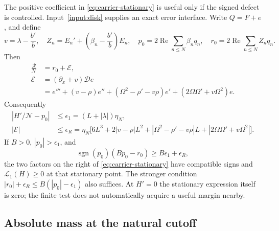 \documentclass[11pt]{article}
\theoremstyle{definition}
\theoremstyle{remark}
\newcommand{\Rea}{\operatorname{Re}}
\begin{document}
The positive coefficient in \eqref{eq:carrier-stationary} is useful
only if the signed defect is controlled. Input~\ref{input:disk}
supplies an exact error interface. Write $Q=F+e$, and define
\[
 v=\lambda-\frac{b'}b,\quad
 Z_n=E_n'+\left(\beta_n-\frac{b'}b\right)E_n,\quad
 p_0=2\Rea\sum_{n\le N}\beta_nq_n,\quad
 r_0=2\Rea\sum_{n\le N}Z_nq_n.
\]
Then
\begin{align}
 \frac{\mathcal R}{\mathcal N}
 &=r_0+\mathcal E,\nonumber\\
 \mathcal E
 &=(\partial_x+v)\mathcal De\nonumber\\
 &=e'''+(v-\rho)e''
   +(\Omega^2-\rho'-v\rho)e'
   +(2\Omega\Omega'+v\Omega^2)e.
 \label{eq:carrier-paid-error}
\end{align}
Consequently
\begin{align}
 \left|H'/\mathcal N-p_0\right|
 &\le\epsilon_1=(L+|\lambda|)\eta_N,\nonumber\\
 |\mathcal E|&\le\epsilon_R=\eta_N\bigl[
 6L^3+2|v-\rho|L^2+|\Omega^2-\rho'-v\rho|L
 +|2\Omega\Omega'+v\Omega^2|\bigr].
 \label{eq:carrier-error-budget}
\end{align}
If $B>0$, $|p_0|>\epsilon_1$, and
\begin{equation}
 \operatorname{sgn}(p_0)(Bp_0-r_0)
 \ge B\epsilon_1+\epsilon_R,
 \label{eq:carrier-signed-test}
\end{equation}
the two factors on the right of \eqref{eq:carrier-stationary}
have compatible signs and $\mathscr L_1(H)\ge0$ at that stationary
point. The stronger condition
$|r_0|+\epsilon_R\le B(|p_0|-\epsilon_1)$ also suffices.
At $H'=0$ the stationary expression itself is zero; the finite test
does not automatically acquire a useful margin nearby.

\subsection{Absolute mass at the natural cutoff}
\end{document}
